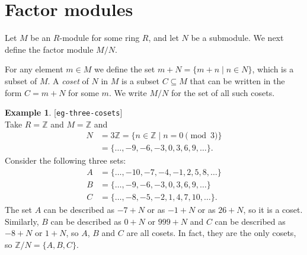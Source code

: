 \documentclass{amsart}
\newcommand{\lbl}[1]{\label{#1}\textup{[\texttt{#1}]}\ \\}
\newcommand{\lbl}{\label}
\newcommand{\Z}         {{\mathbb{Z}}}
\newcommand{\sse}       {\subseteq}
\newcommand{\st}        {\;|\;}
\renewcommand{\:}{\colon}
\theoremstyle{definition}
\newtheorem{example}[theorem]{Example}
\begin{document}
\section{Factor modules}
\label{sec-factor-modules}

Let $M$ be an $R$-module for some ring $R$, and let $N$ be a
submodule.  We next define the factor module $M/N$.

For any element $m\in M$ we define the set $m+N=\{m+n\st n\in N\}$,
which is a subset of $M$.  A \emph{coset} of $N$ in $M$ is a subset
$C\sse M$ that can be written in the form $C=m+N$ for some $m$.  We
write $M/N$ for the set of all such cosets.

\begin{example}\lbl{eg-three-cosets}
 Take $R=\Z$ and $M=\Z$ and 
 \begin{align*}
  N &= 3\Z = \{n\in\Z\st n=0\pmod{3}\} \\
    &= \{\ldots,-9,-6,-3,0,3,6,9,\ldots\}.
 \end{align*}
 Consider the following three sets:
 \begin{align*}
  A &= \{\ldots,-10,-7,-4,-1,2,5,8,\ldots\} \\
  B &= \{\ldots,-9,-6,-3,0,3,6,9,\ldots\} \\
  C &= \{\ldots,-8,-5,-2,1,4,7,10,\ldots\}.
 \end{align*}
 The set $A$ can be described as $-7+N$ or as $-1+N$ or as $26+N$, so
 it is a coset.  Similarly, $B$ can be described as $0+N$ or $999+N$
 and $C$ can be described as $-8+N$ or $1+N$, so $A$, $B$ and $C$ are
 all cosets.  In fact, they are the only cosets, so $\Z/N=\{A,B,C\}$.
\end{example}
\end{document}
